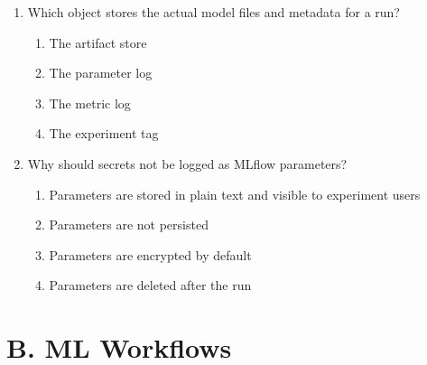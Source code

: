 \documentclass[11pt]{article}
\begin{document}
\begin{enumerate}[leftmargin=*, label=\textbf{Q\arabic*.}]
		\item Which object stores the actual model files and metadata for a run?
		\begin{enumerate}[label=(\alph*)]
			\item The artifact store
			\item The parameter log
			\item The metric log
			\item The experiment tag
		\end{enumerate}
		
		\item Why should secrets not be logged as MLflow parameters?
		\begin{enumerate}[label=(\alph*)]
			\item Parameters are stored in plain text and visible to experiment users
			\item Parameters are not persisted
			\item Parameters are encrypted by default
			\item Parameters are deleted after the run
		\end{enumerate}
		
	\end{enumerate}
	
	\newpage
	\section{B. ML Workflows}
	
\end{document}
